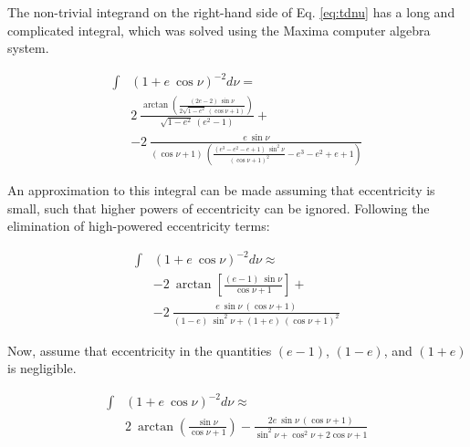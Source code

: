 The non-trivial integrand on the right-hand side of Eq. \ref{eq:tdnu} has a long and complicated integral, which was solved using the Maxima computer algebra system\footnotemark {}. 

\begin{equation}
\label{eq:dnu}
	\begin{split}
		\int & \left(1+e\:\cos\nu\right)^{-2} d\nu = \\ 
			& 2\:\frac{\arctan \left( 
				\frac{(2e-2)\:\sin\nu}{2\sqrt{1-e^2}\:(\cos\nu +1)}
			    \right)}
			             {\sqrt{1-e^2}\:(e^2-1)} + \\
			& -2 \:\frac{e\:\sin\nu}
			    {(\cos\nu +1) \:\left(  
			    	\frac{(e^3-e^2-e+1)\:\sin^2\nu}{(\cos\nu +1)^2}
			    	- e^3 -e^2 + e + 1
			    \right) }
	\end{split}
\end{equation}

An approximation to this integral can be made assuming that eccentricity is small, such that higher powers of eccentricity can be ignored. 
Following the elimination of high-powered eccentricity terms:

\begin{equation}
\label{eq:dnusimpa}
	\begin{split}
		\int & \left(1+e\:\cos\nu\right)^{-2} d\nu \approx \\ 
			& -2\:\arctan \left[
				\frac{(e-1)\:\sin\nu}{\cos\nu +1}
			    \right] + \\
			& -2\:\frac{e\:\sin\nu\:(\cos\nu +1)}
			    {(1-e)\:\sin^2\nu + (1+e)\:(\cos\nu +1)^2}
	\end{split}
\end{equation}

\noindent Now, assume that eccentricity in the quantities $(e-1)$, $(1-e)$, and $(1+e)$ is negligible.

\begin{equation}
\label{eq:dnusimpb}
	\begin{split}
		\int & \left(1+e\:\cos\nu\right)^{-2} d\nu \approx \\ 
			& 2\:\arctan \left( 
				\frac{\sin\nu}{\cos\nu +1}
			    \right) - \frac{2e\:\sin\nu\:(\cos\nu +1)}
			    {\sin^2\nu + \cos^2\nu + 2\cos\nu + 1}
	\end{split}
\end{equation}

